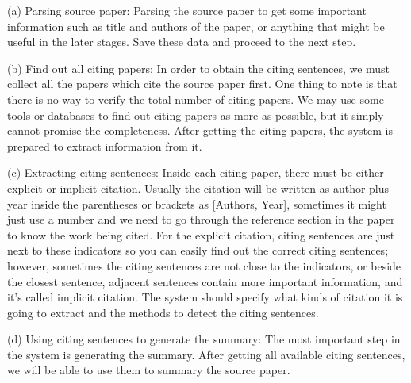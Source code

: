 \documentclass[hyp]{socreport}
\begin{document}


(a) Parsing source paper: Parsing the source paper to get some
important information such as title and authors of the paper,
or anything that might be useful in the later stages. Save these data
and proceed to the next step.

(b) Find out all citing papers: In order to obtain the citing
sentences, we must collect all the papers which cite the source 
paper first. 
One thing to note is that there is no way to verify the total number
of citing papers. We may use some tools or 
databases to find out citing papers as more as possible, but it simply
cannot promise the completeness. After getting the 
citing papers, the system is prepared to extract information from it.

(c) Extracting citing sentences: Inside each citing paper, there must
be either explicit or implicit citation. Usually the 
citation will be written as author plus year inside the parentheses or
brackets as [Authors, Year], sometimes it might just 
use a number and we need to go through the reference section in the
paper to know the work being cited. For the explicit citation, 
citing sentences are just next to these indicators so you can easily
find out the correct citing sentences; however, sometimes the 
citing sentences are not close to the indicators, or beside the
closest sentence, adjacent sentences contain more important
information, 
and it’s called implicit citation. The system should specify what
kinds of citation it is going to extract and the methods to detect 
the citing sentences.

(d) Using citing sentences to generate the summary: The most important
step in the system is generating the summary. After getting 
all available citing sentences, we will be able to use them to summary
the source paper.  
\end{document}
